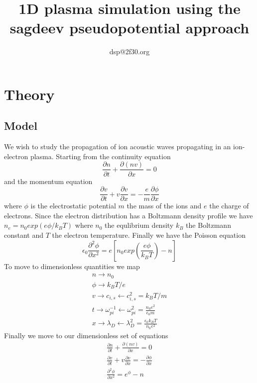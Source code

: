 \documentclass{report}
\author{dsp@2f30.org}
\title{1D plasma simulation using the sagdeev pseudopotential approach}
\begin{document}
\maketitle
\section{Theory}
\subsection{Model}
We wish to study the propagation of ion acoustic waves propagating in an ion-electron plasma.
Starting from the continuity equation
\begin{equation} \label{Model:continuity}
\frac{\partial n}{\partial t} + \frac{\partial (n v)}{\partial x} = 0
\end{equation}
and the momentum equation
\begin{equation} \label{Model:momentum}
\frac{\partial v}{\partial t} + v \frac{\partial v}{\partial x} = - \frac{e}{m} \frac{\partial \phi}{\partial x}
\end{equation}
where $\phi$ is the electrostatic potential $m$ the mass of the ions and $e$ the charge of electrons.
Since the electron distribution has a Boltzmann density profile we have $n_e = n_0 exp(e\phi/k_B T)$ where $n_0$ the
equlibrium density $k_B$ the Boltzmann constant and $T$ the electron temperature.
Finally we have the Poisson equation
\begin{equation} \label{Model:poisson}
\epsilon_0 \frac{\partial^2 \phi}{\partial x^2} = e \left[ n_0 exp\left(\frac{e \phi}{k_B T}\right) - n \right]
\end{equation}
To move to dimensionless quantities we map
\begin{equation} \label{Model:scaling}
\begin{aligned}
	n \rightarrow n_0 \\
	\phi \rightarrow k_B T/e \\
	v \rightarrow c_{i,s} \leftarrow  c_{i,s}^2 = k_B T/m \\
	t \rightarrow \omega_{pi}^{-1} \leftarrow \omega_{pi}^{2} = \frac{n_0 e^2}{\epsilon_0 m} \\
	x \rightarrow \lambda_D \leftarrow \lambda_D^2 = \frac{\epsilon_0 k_B T}{n_0 e^2}
\end{aligned}
\end{equation}
Finally we move to our dimensionless set of equations
\begin{equation} \label{Modem:systemnodim}
\begin{aligned}
	\frac{\partial n}{\partial t} + \frac{\partial (n v)}{\partial x} = 0 \\
	\frac{\partial v}{\partial t} + v \frac{\partial v}{\partial x} = -\frac{\partial \phi}{\partial x} \\
	\frac{\partial^2 \phi}{\partial x^2} = e^{\phi} - n
\end{aligned}
\end{equation}
\end{document}
